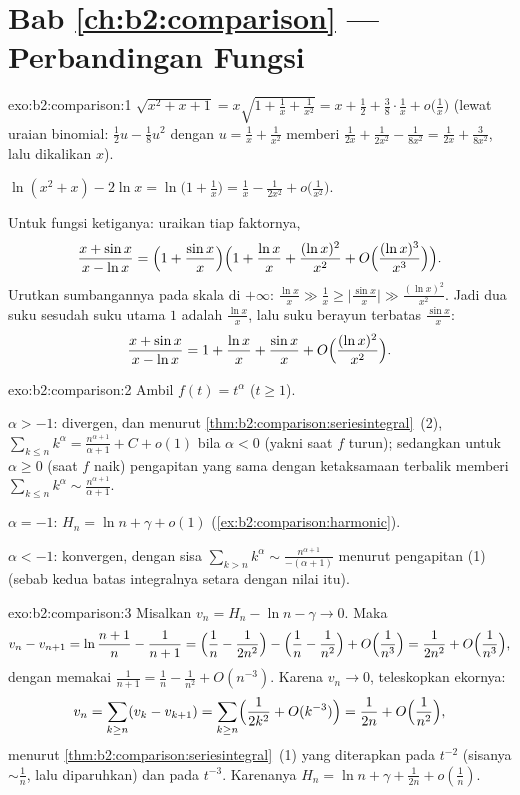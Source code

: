 \section*{Bab \ref{ch:b2:comparison} --- Perbandingan Fungsi}

\begin{solution}{exo:b2:comparison:1}
$\sqrt{x^2 + x + 1} = x\sqrt{1 + \tfrac1x + \tfrac{1}{x^2}} = x +
\frac12 + \frac38\cdot\frac1x + o\bigl(\frac1x\bigr)$ (lewat uraian
binomial: $\frac12 u - \frac18 u^2$ dengan $u = \frac1x +
\frac{1}{x^2}$ memberi $\frac{1}{2x} + \frac{1}{2x^2} -
\frac{1}{8x^2} = \frac{1}{2x} + \frac{3}{8x^2}$, lalu dikalikan
$x$).

$\ln(x^2 + x) - 2\ln x = \ln\bigl(1 + \tfrac1x\bigr) = \frac1x -
\frac{1}{2x^2} + o\bigl(\frac{1}{x^2}\bigr)$.

Untuk fungsi ketiganya: uraikan tiap faktornya,
\[
\frac{x + \sin x}{x - \ln x}
= \Bigl(1 + \frac{\sin x}{x}\Bigr)
\Bigl(1 + \frac{\ln x}{x} + \frac{(\ln x)^2}{x^2} +
O\Bigl(\frac{(\ln x)^3}{x^3}\Bigr)\Bigr).
\]
Urutkan sumbangannya pada skala di $+\infty$: $\frac{\ln x}{x}
\gg \frac{1}{x} \geq \bigl|\frac{\sin x}{x}\bigr| \gg \frac{(\ln
x)^2}{x^2}$. Jadi dua suku sesudah suku utama $1$ adalah
$\frac{\ln x}{x}$, lalu suku berayun terbatas $\frac{\sin
x}{x}$:
\[
\frac{x + \sin x}{x - \ln x}
= 1 + \frac{\ln x}{x} + \frac{\sin x}{x}
+ O\Bigl(\frac{(\ln x)^2}{x^2}\Bigr).
\]
\end{solution}

\begin{solution}{exo:b2:comparison:2}
Ambil $f(t) = t^\alpha$ ($t \geq 1$).

$\alpha > -1$: divergen, dan menurut
\cref{thm:b2:comparison:seriesintegral}~(2), $\sum_{k\leq n}
k^\alpha = \frac{n^{\alpha+1}}{\alpha+1} + C + o(1)$ bila $\alpha <
0$ (yakni saat $f$ turun); sedangkan untuk $\alpha \geq 0$ (saat $f$
naik) pengapitan yang sama dengan ketaksamaan terbalik memberi
$\sum_{k \leq n} k^\alpha \sim \frac{n^{\alpha + 1}}{\alpha + 1}$.

$\alpha = -1$: $H_n = \ln n + \gamma + o(1)$
(\cref{ex:b2:comparison:harmonic}).

$\alpha < -1$: konvergen, dengan sisa $\sum_{k > n} k^\alpha
\sim \frac{n^{\alpha+1}}{-(\alpha+1)}$ menurut pengapitan (1) (sebab
kedua batas integralnya setara dengan nilai itu).
\end{solution}

\begin{solution}{exo:b2:comparison:3}
Misalkan $v_n = H_n - \ln n - \gamma \to 0$. Maka
\[
v_n - v_{n+1} = \ln\frac{n+1}{n} - \frac{1}{n+1}
= \Bigl(\frac1n - \frac{1}{2n^2}\Bigr) - \Bigl(\frac1n -
\frac{1}{n^2}\Bigr) + O\Bigl(\frac{1}{n^3}\Bigr)
= \frac{1}{2n^2} + O\Bigl(\frac{1}{n^3}\Bigr),
\]
dengan memakai $\frac{1}{n+1} = \frac1n - \frac{1}{n^2} + O(n^{-3})$.
Karena $v_n \to 0$, teleskopkan ekornya:
\[
v_n = \sum_{k \geq n} (v_k - v_{k+1})
= \sum_{k\geq n} \Bigl(\frac{1}{2k^2} + O(k^{-3})\Bigr)
= \frac{1}{2n} + O\Bigl(\frac{1}{n^2}\Bigr),
\]
menurut \cref{thm:b2:comparison:seriesintegral}~(1) yang diterapkan pada
$t^{-2}$ (sisanya $\sim \frac1n$, lalu diparuhkan) dan pada $t^{-3}$.
Karenanya $H_n = \ln n + \gamma + \frac{1}{2n} + o(\frac1n)$.
\end{solution}


